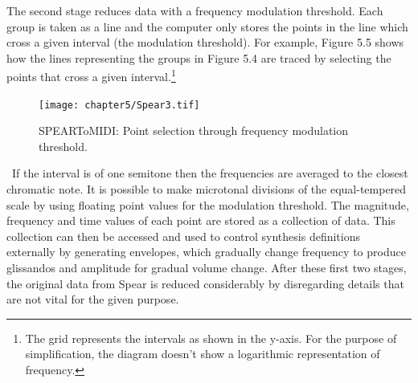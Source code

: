 The second stage reduces data with a frequency modulation threshold. Each group is taken as a line and the computer only stores the points in the line which cross a given interval (the modulation threshold). For example, Figure 5.5 shows how the lines representing the groups in Figure 5.4 are traced by selecting the points that cross a given interval.\footnote{The grid represents the intervals as shown in the y-axis. For the purpose of simplification, the diagram doesn't show a logarithmic representation of frequency.} 
\begin{figure}[htbp] %
   \centering
   \texttt{[image: chapter5/Spear3.tif]} %
   \caption{SPEARToMIDI: Point selection through frequency modulation threshold.}
   \label{fig:example}
\end{figure}\
If the interval is of one semitone then the frequencies are averaged to the closest chromatic note. It is possible to make microtonal divisions of the equal-tempered scale by using floating point values for the modulation threshold. The magnitude, frequency and time values of each point are stored as a collection of data. This collection can then be accessed and used to control synthesis definitions externally by generating envelopes, which gradually change frequency to produce glissandos and amplitude for gradual volume change. After these first two stages, the original data from Spear is reduced considerably by disregarding details that are not vital for the given purpose. 

